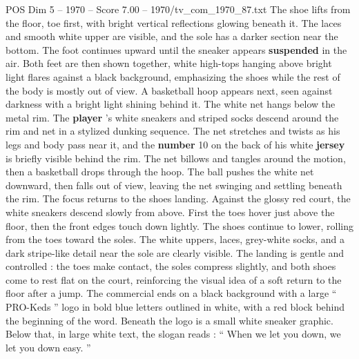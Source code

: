 \begin{textsample}{POS Dim 5 – 1970 – Score 7.00 – 1970/tv\_com\_1970\_87.txt}
The shoe lifts from the floor, toe first, with bright vertical reflections glowing beneath it.
The laces and smooth white upper are visible, and the sole has a darker section near the bottom.
The foot continues upward until the sneaker appears \textbf{suspended} in the air.
Both feet are then shown together, white high-tops hanging above bright light flares against a black background, emphasizing the shoes while the rest of the body is mostly out of view.
A basketball hoop appears next, seen against darkness with a bright light shining behind it.
The white net hangs below the metal rim.
The \textbf{player} ’s white sneakers and striped socks descend around the rim and net in a stylized dunking sequence.
The net stretches and twists as his legs and body pass near it, and the \textbf{number} 10 on the back of his white \textbf{jersey} is briefly visible behind the rim.
The net billows and tangles around the motion, then a basketball drops through the hoop.
The ball pushes the white net downward, then falls out of view, leaving the net swinging and settling beneath the rim.
The focus returns to the shoes landing.
Against the glossy red court, the white sneakers descend slowly from above.
First the toes hover just above the floor, then the front edges touch down lightly.
The shoes continue to lower, rolling from the toes toward the soles.
The white uppers, laces, grey-white socks, and a dark stripe-like detail near the sole are clearly visible.
The landing is gentle and controlled : the toes make contact, the soles compress slightly, and both shoes come to rest flat on the court, reinforcing the visual idea of a soft return to the floor after a jump.
The commercial ends on a black background with a large “ PRO-Keds ” logo in bold blue letters outlined in white, with a red block behind the beginning of the word.
Beneath the logo is a small white sneaker graphic.
Below that, in large white text, the slogan reads : “ When we let you down, we let you down easy. ”

\end{textsample}
